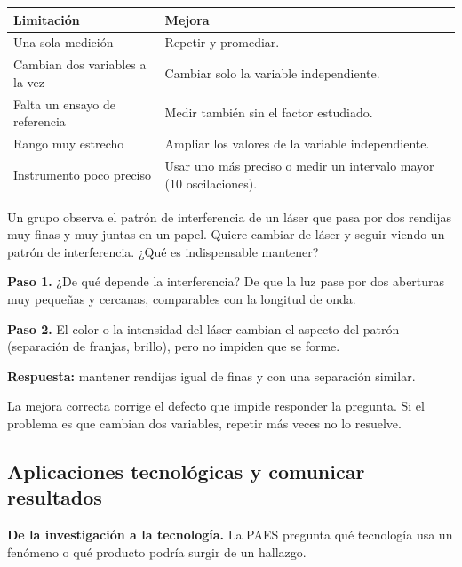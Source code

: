  
\begin{center}\small
\begin{tabularx}{\linewidth}{@{}>{\raggedright\arraybackslash\hsize=0.86\hsize}X>{\raggedright\arraybackslash\hsize=1.14\hsize}X@{}}
\toprule
\textbf{Limitación} & \textbf{Mejora} \\
\midrule
Una sola medición & Repetir y promediar. \\
Cambian dos variables a la vez & Cambiar solo la variable independiente. \\
Falta un ensayo de referencia & Medir también sin el factor estudiado. \\
Rango muy estrecho & Ampliar los valores de la variable independiente. \\
Instrumento poco preciso & Usar uno más preciso o medir un intervalo mayor (10 oscilaciones). \\
\bottomrule
\end{tabularx}
\end{center}
  
\begin{ejemplo} Un grupo observa el patrón de interferencia de un láser que pasa por dos rendijas muy finas y muy juntas en un papel. Quiere cambiar de láser y seguir viendo un patrón de interferencia. ¿Qué es indispensable mantener?\par \textbf{Paso 1.} ¿De qué depende la interferencia? De que la luz pase por dos aberturas muy pequeñas y cercanas, comparables con la longitud de onda.\par \textbf{Paso 2.} El color o la intensidad del láser cambian el aspecto del patrón (separación de franjas, brillo), pero no impiden que se forme.\par \textbf{Respuesta:} mantener rendijas igual de finas y con una separación similar.\end{ejemplo}
 
\begin{clave}[{Recuerda}] La mejora correcta corrige el defecto que impide responder la pregunta. Si el problema es que cambian dos variables, repetir más veces no lo resuelve.\end{clave}
\subsection{Aplicaciones tecnológicas y comunicar resultados}
\textbf{De la investigación a la tecnología.} La PAES pregunta qué tecnología usa un fenómeno o qué producto podría surgir de un hallazgo.

